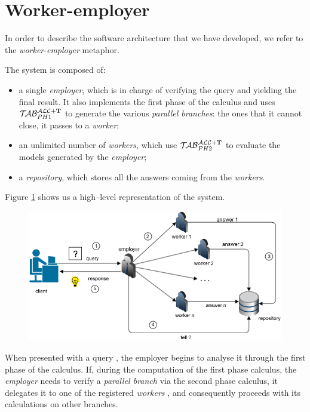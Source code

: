 \documentclass[a4paper, 11pt, oneside]{duthesis}
\newcommand*\circled[1]{\tikz[baseline=(char.base)]{
            \node[shape=circle,draw,inner sep=2pt] (char) {#1};}}
\newcommand{\tip}{{\bf T}}
\newcommand{\primo}{\mathrel{{\mathcal{T}\!\mathcal{AB}}}_{PH 1}^{\mathcal{ALC}+\mbox{\scriptsize $\tip$}}}
\newcommand{\secondo}{\mathrel{{\mathcal{T}\!\mathcal{AB}}}_{PH 2}^{\mathcal{ALC}+\mbox{\scriptsize $\tip$}}}
\begin{document}
\section{Worker-employer}\label{workemp}

In order to describe the software architecture that we have developed, we refer to the \emph{worker}-\emph{employer} metaphor.

The system is composed of:
\begin{itemize}
\item a single \emph{employer}, which is in charge of verifying the query and yielding the final result. It also implements the first phase of the calculus and uses $\primo$ to generate the various \emph{parallel branches}: the ones that it cannot close, it passes to a \emph{worker};
\item an unlimited number of \emph{workers}, which use $\secondo$ to evaluate the models generated by the \emph{employer};
\item a \emph{repository}, which stores all the answers coming from the \emph{workers}.
\end{itemize}

\newpage

Figure \ref{DIAG_1} shows us a high--level representation of the system.

\begin{figure}[H]
\centering
\includegraphics[scale=.9]{img/DIAG_1.png}
\caption{}
\label{DIAG_1}
\end{figure}

When presented with a query \circled{1}, the employer begins to analyse it through the first phase of the calculus.
If, during the computation of the first phase calculus, the \emph{employer} needs to verify a \emph{parallel branch} via the second phase calculus, it delegates it to one of the registered \emph{workers} \circled{2}, and consequently proceeds with its calculations on other branches.
\end{document}
